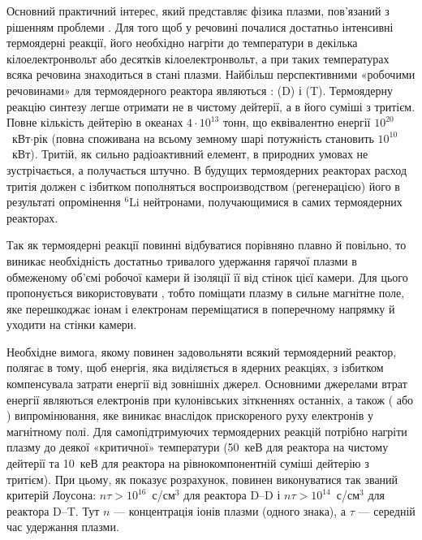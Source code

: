 Основний практичний інтерес, який представляє фізика плазми, пов'язаний з рішенням проблеми . Для того щоб у речовині почалися достатньо інтенсивні термоядерні реакції, його необхідно нагріти до температури в декілька кілоелектронвольт або десятків кілоелектронвольт, а при таких температурах всяка речовина знаходиться в стані плазми. Найбільш перспективними «робочими речовинами» для термоядерного реактора являються :  (D) і  (T). Термоядерну реакцію синтезу легше отримати не в чистому дейтерії, а в його суміші з тритієм. Повне кількість дейтерію в океанах $4\cdot10^{13}$ тонн, що еквівалентно енергії $10^{20}$~кВт$\cdot$рік (повна споживана на всьому земному шарі потужність становить $10^{10}$~кВт). Тритій, як сильно радіоактивний елемент, в природних умовах не зустрічається, а получається штучно. В будущих термоядерних реакторах расход тритія должен с ізбитком пополняться воспроизводством (регенерацією) його в результаті опромінення $^6$Li нейтронами, получающимися в самих термоядерних реакторах.

Так як термоядерні реакції повинні відбуватися порівняно плавно й повільно, то виникає необхідність достатньо тривалого удержання гарячої плазми в обмеженому об'ємі робочої камери й ізоляції її від стінок цієї камери. Для цього пропонується використовувати , тобто поміщати плазму в сильне магнітне поле, яке перешкоджає іонам і електронам переміщатися в поперечному напрямку й уходити на стінки камери.

Необхідне вимога, якому повинен задовольняти всякий термоядерний реактор, полягає в тому, щоб енергія, яка виділяється в ядерних реакціях, з ізбитком компенсувала затрати енергії від
зовнішніх джерел. Основними джерелами втрат енергії являються  електронів при кулонівських зіткненнях останніх, а також  ( або ) випромінювання, яке виникає внаслідок прискореного руху електронів у магнітному полі. Для самопідтримуючих термоядерних реакцій потрібно нагріти плазму до деякої «критичної» температури (50~кеВ для реактора на чистому дейтерії та 10~кеВ для реактора на рівнокомпонентній суміші дейтерію з тритієм). При цьому, як показує розрахунок, повинен виконуватися так званий критерій Лоусона: $n\tau > 10^{16}$~с/см$^3$ для реактора D--D і $n\tau > 10^{14}$~с/см$^3$ для реактора D--T. Тут $n$ --- концентрація іонів плазми (одного знака), а $\tau$ --- середній час удержання плазми.


